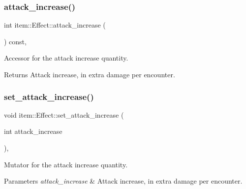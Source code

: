 \subsubsection{\texorpdfstring{attack\+\_\+increase()}{attack\_increase()}}
{\footnotesize\ttfamily int item\+::\+Effect\+::attack\+\_\+increase (\begin{DoxyParamCaption}{ }\end{DoxyParamCaption}) const\hspace{0.3cm}{\ttfamily [inline]}, {\ttfamily [noexcept]}}



Accessor for the attack increase quantity. 

\begin{DoxyReturn}{Returns}
Attack increase, in extra damage per encounter. 
\end{DoxyReturn}
\mbox{\label{classitem_1_1_effect_a0a98eb24f70970c00b95cfa0a40f6a6a}} 
\subsubsection{\texorpdfstring{set\+\_\+attack\+\_\+increase()}{set\_attack\_increase()}}
{\footnotesize\ttfamily void item\+::\+Effect\+::set\+\_\+attack\+\_\+increase (\begin{DoxyParamCaption}\item[{int}]{attack\+\_\+increase }\end{DoxyParamCaption})\hspace{0.3cm}{\ttfamily [inline]}, {\ttfamily [noexcept]}}



Mutator for the attack increase quantity. 


\begin{DoxyParams}{Parameters}
{\em attack\+\_\+increase} & Attack increase, in extra damage per encounter. \\
\hline
\end{DoxyParams}
\mbox{\label{classitem_1_1_effect_ad74a155925b8072030afabf3bb13ba4a}} 
